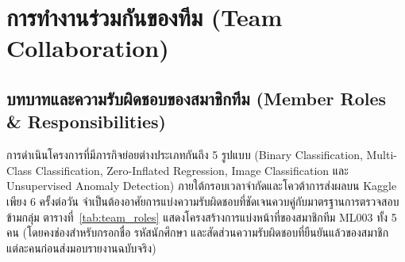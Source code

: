 \clearpage
\section{การทำงานร่วมกันของทีม (Team Collaboration)}
\label{sec:collaboration}

\subsection{บทบาทและความรับผิดชอบของสมาชิกทีม (Member Roles \& Responsibilities)}
\label{subsec:team_roles}

การดำเนินโครงการที่มีภารกิจย่อยต่างประเภทกันถึง 5 รูปแบบ (Binary Classification, Multi-Class Classification, Zero-Inflated Regression, Image Classification และ Unsupervised Anomaly Detection) ภายใต้กรอบเวลาจำกัดและโควต้าการส่งผลบน Kaggle เพียง 6 ครั้งต่อวัน จำเป็นต้องอาศัยการแบ่งความรับผิดชอบที่ชัดเจนควบคู่กับมาตรฐานการตรวจสอบข้ามกลุ่ม ตารางที่~\ref{tab:team_roles} แสดงโครงสร้างการแบ่งหน้าที่ของสมาชิกทีม ML003 ทั้ง 5 คน (โดยคงช่องสำหรับกรอกชื่อ รหัสนักศึกษา และสัดส่วนความรับผิดชอบที่ยืนยันแล้วของสมาชิกแต่ละคนก่อนส่งมอบรายงานฉบับจริง)

